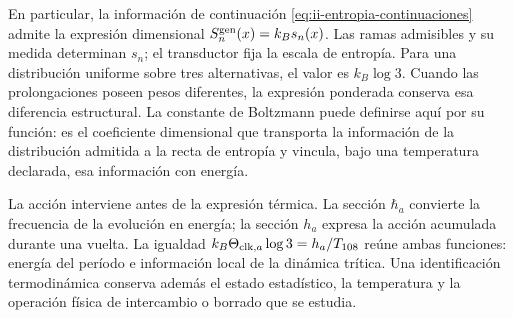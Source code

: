 En particular, la información de continuación
\eqref{eq:ii-entropia-continuaciones} admite la expresión dimensional
\(S_n^{\rm gen}(x)=k_Bs_n(x)\). Las ramas admisibles y su medida
determinan \(s_n\); el transductor fija la escala de entropía. Para
una distribución uniforme sobre tres alternativas, el valor es
\(k_B\log3\). Cuando las prolongaciones poseen pesos diferentes,
la expresión ponderada conserva esa diferencia estructural. La
constante de Boltzmann puede definirse aquí por su función: es el
coeficiente dimensional que transporta la información de la
distribución admitida a la recta de entropía y vincula, bajo una
temperatura declarada, esa información con energía.

La acción interviene antes de la expresión térmica. La sección
\(\hbar_a\) convierte la frecuencia de la evolución en energía;
la sección \(h_a\) expresa la acción acumulada durante una vuelta.
La igualdad \(k_B\Theta_{{\rm clk},a}\log3=h_a/T_{108}\)
reúne ambas funciones: energía del período e información local de
la dinámica trítica. Una identificación termodinámica conserva
además el estado estadístico, la temperatura y la operación física
de intercambio o borrado que se estudia.
